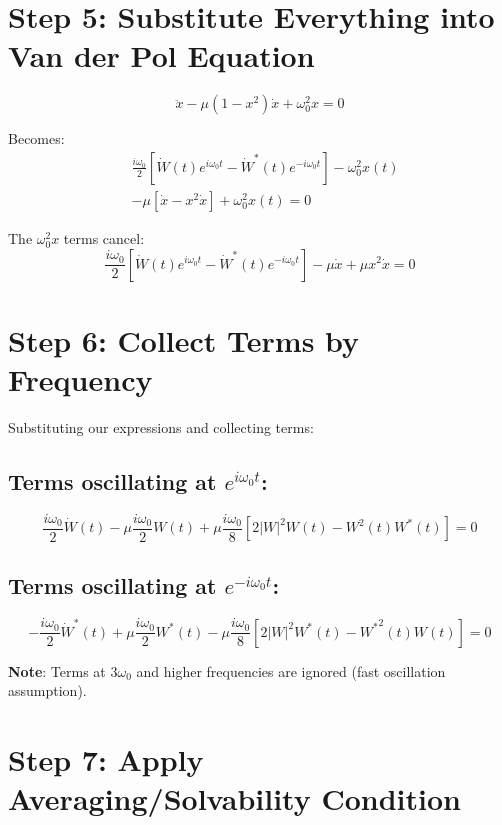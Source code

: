 \documentclass{article}
\begin{document}
\section{Step 5: Substitute Everything into Van der Pol Equation}

\begin{equation}
\ddot{x} - \mu(1 - x^2)\dot{x} + \omega_0^2 x = 0
\end{equation}

Becomes:
\begin{align}
&\frac{i\omega_0}{2}[\dot{W}(t)e^{i\omega_0 t} - \dot{W}^*(t)e^{-i\omega_0 t}] - \omega_0^2 x(t) \nonumber \\
&- \mu[\dot{x} - x^2\dot{x}] + \omega_0^2 x(t) = 0
\end{align}

The $\omega_0^2 x$ terms cancel:
\begin{equation}
\frac{i\omega_0}{2}[\dot{W}(t)e^{i\omega_0 t} - \dot{W}^*(t)e^{-i\omega_0 t}] - \mu\dot{x} + \mu x^2\dot{x} = 0
\end{equation}

\section{Step 6: Collect Terms by Frequency}

Substituting our expressions and collecting terms:

\subsection{Terms oscillating at $e^{i\omega_0 t}$:}
\begin{equation}
\frac{i\omega_0}{2}\dot{W}(t) - \mu\frac{i\omega_0}{2}W(t) + \mu\frac{i\omega_0}{8}[2|W|^2 W(t) - W^2(t)W^*(t)] = 0
\end{equation}

\subsection{Terms oscillating at $e^{-i\omega_0 t}$:}
\begin{equation}
-\frac{i\omega_0}{2}\dot{W}^*(t) + \mu\frac{i\omega_0}{2}W^*(t) - \mu\frac{i\omega_0}{8}[2|W|^2 W^*(t) - {W^*}^2(t)W(t)] = 0
\end{equation}

\textbf{Note}: Terms at $3\omega_0$ and higher frequencies are ignored (fast oscillation assumption).

\section{Step 7: Apply Averaging/Solvability Condition}
\end{document}
